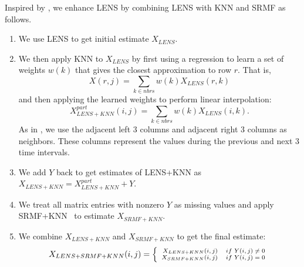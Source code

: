 {%
Inspired by \cite{zhang09sensing}, we enhance LENS by combining LENS
with KNN and SRMF as follows.
\begin{enumerate}
\item We use LENS to get initial estimate $X_{LENS}$.
\item We then apply KNN to $X_{LENS}$ by first using a regression to learn a set of weights
$w(k)$ that gives the closest approximation to row $r$. That is,
  \[X(r,j) =\sum_{k\in nbrs} w(k) X_{LENS}(r,k)\]
  and then applying the learned weights to perform linear
  interpolation:
  \[X_{LENS+KNN}^{part}(i,j) =\sum_{k\in nbrs}w(k)X_{LENS}(i,k).\] As
  in \cite{zhang09sensing}, we use the adjacent left 3 columns and
  adjacent right 3 columns as neighbors. These columns represent the
  values during the previous and next 3 time intervals.
\item We add $Y$ back to get estimates of LENS+KNN as $X_{LENS+KNN}=X_{LENS+KNN}^{part}+Y$.
\item We treat all matrix entries with nonzero $Y$ as missing values
and apply SRMF+KNN~\cite{zhang09sensing} to estimate $X_{SRMF+KNN}$.
\item We combine $X_{LENS+KNN}$ and $X_{SRMF+KNN}$ to get the final
estimate:
\[{\scriptsize X_{LENS+SRMF+KNN}(i,j)\\
  = \left\{\begin{array}{rr}
X_{LENS+KNN}(i,j) & if\ Y(i,j) \neq 0\\
X_{SRMF+KNN}(i,j) & if\ Y(i,j) = 0\end{array}\right.}\]
\end{enumerate}

}
